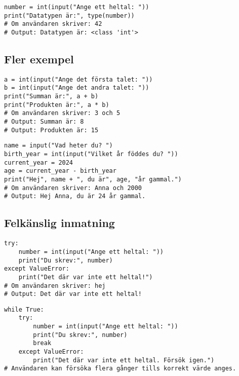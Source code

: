 \begin{lstlisting}[title=Exempel 6: Kontrollera datatyp efter konvertering]
number = int(input("Ange ett heltal: "))
print("Datatypen är:", type(number))
# Om användaren skriver: 42
# Output: Datatypen är: <class 'int'>
\end{lstlisting}

\subsection*{Fler exempel}

\begin{lstlisting}[title=Exempel 7: Utföra matematiska operationer]
a = int(input("Ange det första talet: "))
b = int(input("Ange det andra talet: "))
print("Summan är:", a + b)
print("Produkten är:", a * b)
# Om användaren skriver: 3 och 5
# Output: Summan är: 8
# Output: Produkten är: 15
\end{lstlisting}

\begin{lstlisting}[title=Exempel 8: Kombinera text och beräkningar]
name = input("Vad heter du? ")
birth_year = int(input("Vilket år föddes du? "))
current_year = 2024
age = current_year - birth_year
print("Hej", name + ", du är", age, "år gammal.")
# Om användaren skriver: Anna och 2000
# Output: Hej Anna, du är 24 år gammal.
\end{lstlisting}

\subsection*{Felkänslig inmatning}

\begin{lstlisting}[title=Exempel 9: Hantera felaktig inmatning]
try:
    number = int(input("Ange ett heltal: "))
    print("Du skrev:", number)
except ValueError:
    print("Det där var inte ett heltal!")
# Om användaren skriver: hej
# Output: Det där var inte ett heltal!
\end{lstlisting}

\begin{lstlisting}[title=Exempel 10: Begära inmatning tills den är korrekt]
while True:
    try:
        number = int(input("Ange ett heltal: "))
        print("Du skrev:", number)
        break
    except ValueError:
        print("Det där var inte ett heltal. Försök igen.")
# Användaren kan försöka flera gånger tills korrekt värde anges.
\end{lstlisting}
